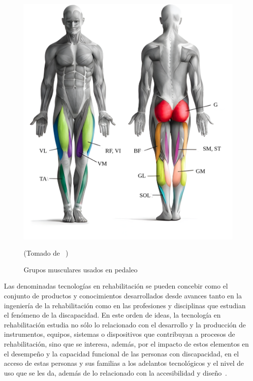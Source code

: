 \begin{figure}[ht]
    \centering
    \includegraphics[scale=0.2]{images/musculegroups.png}
    \caption{Grupos musculares usados en pedaleo}
    (Tomado de ~\cite{Quémúsc72})
    \label{fig: musculegroups}
\end{figure}

Las denominadas tecnologías en rehabilitación se pueden concebir como el conjunto de productos y conocimientos desarrollados desde avances tanto en la ingeniería de la rehabilitación como en las profesiones y disciplinas que estudian el fenómeno de la discapacidad. En este orden de ideas, la tecnología en rehabilitación estudia no sólo lo relacionado con el desarrollo y la producción de instrumentos, equipos, sistemas o dispositivos que contribuyan a procesos de rehabilitación, sino que se interesa, además, por el impacto de estos elementos en el desempeño y la capacidad funcional de las personas con discapacidad, en el acceso de estas personas y sus familias a los adelantos tecnológicos y el nivel de uso que se les da, además de lo relacionado con la accesibilidad y diseño~\cite{matheus1990tecnologia}.


